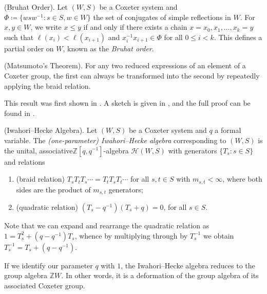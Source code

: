 \noindent\begin{definition}\textnormal{(Bruhat Order).} Let $(W, S)$ be a Coxeter system and $\Phi \coloneqq \{wsw^{-1} : s \in S, w \in W\}$ the set of conjugates of simple reflections in $W$. For $x, y \in W$, we write $x \leq y$ if and only if there exists a chain $x = x_0, x_1, \dots, x_k = y$ such that $\ell(x_i) < \ell(x_{i+1})$ and $x_i^{-1}x_{i+1} \in \Phi$ for all $0 \leq i < k$. This defines a partial order on $W$, known as the {\em Bruhat order}.\\
\end{definition}

\noindent\begin{theorem}\label{Matsumoto}\textnormal{(Matsumoto's Theorem).} For any two reduced expressions of an element of a Coxeter group, the first can always be transformed into the second by repeatedly applying the braid relation.\\
\end{theorem}

\noindent This result was first shown in \cite{Mat64}. A sketch is given in \cite[Theorem 2.20]{EMTW20}, and the full proof can be found in \cite[Theorem 1.2.2]{GP00}.\newpage

\noindent\begin{definition}\textnormal{(Iwahori--Hecke Algebra).} Let $(W, S)$ be a Coxeter system and $q$ a formal variable. The {\em (one-parameter) Iwahori--Hecke algebra} corresponding to $(W, S)$ is the unital, associative\linebreak $\mathbb{Z}[q, q^{-1}]$-algebra $\mathscr{H}(W, S)$ with generators $\{T_s : s \in S\}$ and relations
\begin{enumerate}[label=$\bullet$, leftmargin=4\parindent]
\item (braid relation) $T_sT_tT_s\cdots = T_tT_sT_t\cdots$ for all $s, t \in S$ with $m_{s,t} < \infty$, where both sides are the product of $m_{s,t}$ generators;
\item (quadratic relation) $(T_s - q^{-1})(T_s + q) = 0$, for all $s \in S$.\\
\end{enumerate}
\end{definition}

\noindent Note that we can expand and rearrange the quadratic relation as $1 = T_s^2 + (q - q^{-1})T_s$, whence by multiplying through by $T_s^{-1}$ we obtain $T_s^{-1} = T_s + (q - q^{-1})$.\\

\noindent\begin{remark} If we identify our parameter $q$ with $1$, the Iwahori--Hecke algebra reduces to the group algebra $\mathbb{Z}W$. In other words, it is a deformation of the group algebra of its associated Coxeter group.\\
\end{remark}

